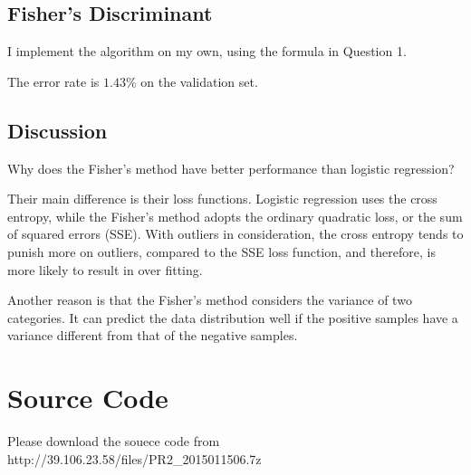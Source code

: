 \documentclass{article}
\begin{document}
{{    }

    \subsection*{Fisher's Discriminant}
    {
        I implement the algorithm on my own, using the formula in Question 1.

        The error rate is $1.43\%$ on the validation set.

    }

    \subsection*{Discussion}
    {
        Why does the Fisher's method have better performance than logistic regression? 

        Their main difference is their loss functions. Logistic regression uses the cross entropy, while the Fisher's method adopts the ordinary quadratic loss, or the sum of squared errors (SSE). With outliers in consideration, the cross entropy tends to punish more on outliers, compared to the SSE loss function, and therefore, is more likely to result in over fitting.

        Another reason is that the Fisher's method considers the variance of two categories. It can predict the data distribution well if the positive samples have a variance different from that of the negative samples.

    }
}

\section*{Source Code}
{
    Please download the souece code from http://39.106.23.58/files/PR2\_2015011506.7z
}

\clearpage
\end{document}
